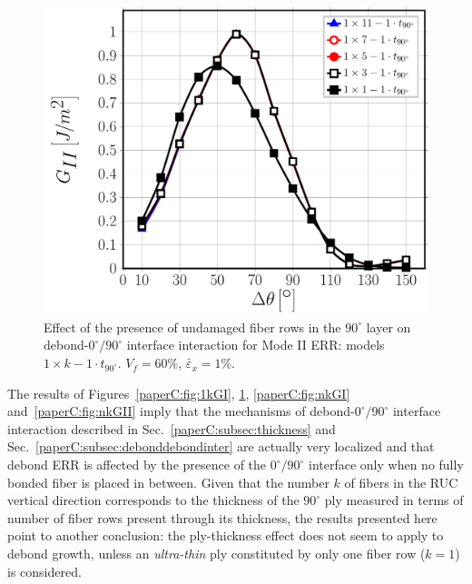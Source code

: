 \begin{figure}[!htb]
\centering
\includegraphics[width=\textwidth]{paperC/1xk-1-vf60-GII.pdf}
\caption{Effect of the presence of undamaged fiber rows in the $90^{\circ}$ layer on debond-$0^{\circ}/90^{\circ}$ interface interaction for Mode II ERR: models $1\times k-1\cdot t_{90^{\circ}}$. $V_{f}=60\%$, $\bar{\varepsilon}_{x}=1\%$.}\label{paperC:fig:1kGII}
\end{figure}

The results of Figures~\ref{paperC:fig:1kGI}, \ref{paperC:fig:1kGII}, \ref{paperC:fig:nkGI} and~\ref{paperC:fig:nkGII} imply that the mechanisms of debond-$0^{\circ}/90^{\circ}$ interface interaction described in Sec.~\ref{paperC:subsec:thickness} and Sec.~\ref{paperC:subsec:debonddebondinter} are actually very localized and that debond ERR is affected by the presence of the $0^{\circ}/90^{\circ}$ interface only when no fully bonded fiber is placed in between. Given that the number $k$ of fibers in the RUC vertical direction corresponds to the thickness of the $90^{\circ}$ ply measured in terms of number of fiber rows present through its thickness, the results presented here point to another conclusion: the ply-thickness effect does not seem to apply to debond growth, unless an \textit{ultra-thin} ply constituted by only one fiber row ($k=1$) is considered.\\

